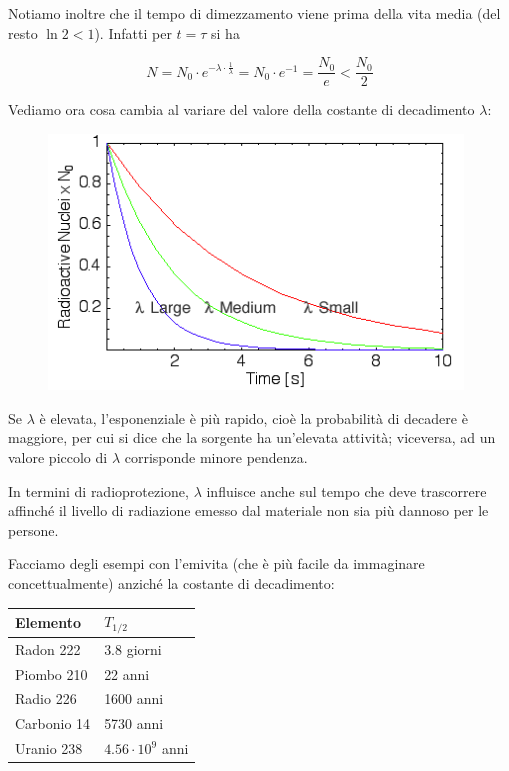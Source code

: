 
Notiamo inoltre che il tempo di dimezzamento viene prima della vita media (del resto $\ln 2 < 1$). Infatti per $t=\tau$ si ha

$$N=N_0 \cdot e^{-\lambda \cdot \frac{1}{\lambda}}
=N_0 \cdot e^{-1}=\frac{N_0}{e}<\frac{N_0}{2}$$



Vediamo ora cosa cambia al variare del valore della costante di decadimento $\lambda$:

\begin{figure}[H]
    \centering
    \includegraphics[width=11cm]{immagini/legge_decadimento_radioattivo_2.png}
\end{figure}

Se $\lambda$ è elevata, l'esponenziale è più rapido, cioè la probabilità di decadere è maggiore, per cui si dice che la sorgente ha un'elevata attività; viceversa, ad un valore piccolo di $\lambda$ corrisponde minore pendenza.

In termini di radioprotezione, $\lambda$ influisce anche sul tempo che deve trascorrere affinché il livello di radiazione emesso dal materiale non sia più dannoso per le persone.

Facciamo degli esempi con l'emivita (che è più facile da immaginare concettualmente) anziché la costante di decadimento:


\begin{center}
    \begin{tabular}{|l|l|}
        \hline
        Elemento & $T_{1/2}$\\
        \hline
        Radon 222 & 3.8 giorni\\
        \hline
        Piombo 210 & 22 anni\\
        \hline
        Radio 226 & 1600 anni\\
        \hline
        Carbonio 14 & 5730 anni\\
        \hline
        Uranio 238 & $4.56 \cdot 10^9$ anni\\
        \hline
    \end{tabular}
\end{center}

